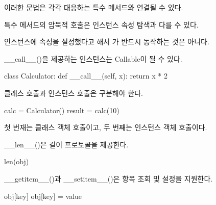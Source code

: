 이러한 문법은 각각 대응하는 특수 메서드와 연결될 수 있다.

\begin{dhknote}
\begin{dhksmry}[centered]
특수 메서드의 암묵적 호출은
인스턴스 속성 탐색과 다를 수 있다.
\end{dhksmry}
\end{dhknote}

인스턴스에  속성을 설정했다고 해서 가 반드시 동작하는 것은 아니다.

\begin{dhknote}
\begin{dhksmry}[centered]
__call__()을 제공하는 인스턴스는 Callable이 될 수 있다.
\end{dhksmry}
\end{dhknote}

\begin{dhkcode}
class Calculator:
    def __call__(self, x):
        return x * 2
\end{dhkcode}

\begin{dhknote}
\begin{dhksmry}[centered]
클래스 호출과 인스턴스 호출은 구분해야 한다.
\end{dhksmry}
\end{dhknote}

\begin{dhkcode}
calc = Calculator()
result = calc(10)
\end{dhkcode}

첫 번재는 클래스 객체 호출이고, 두 번째는 인스턴스 객체 호출이다.

\begin{dhknote}
\begin{dhksmry}[centered]
__len__()은 길이 프로토콜을 제공한다.
\end{dhksmry}
\end{dhknote}

\begin{dhkcode}
len(obj)
\end{dhkcode}

\begin{dhknote}
\begin{dhksmry}[centered]
__getitem__()과 __setitem__()은 
항목 조회 및 설정을 지원한다.
\end{dhksmry}
\end{dhknote}

\begin{dhkcode}
obj[key]
obj[key] = value
\end{dhkcode}

